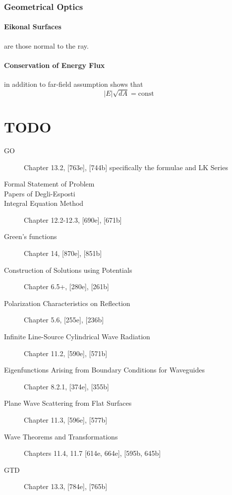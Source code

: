 \documentclass{article}
\numberwithin{equation}{section}
\begin{document}
    \subsubsection{Geometrical Optics}
        \paragraph{Eikonal Surfaces} are those normal to the ray. 
        \paragraph{Conservation of Energy Flux} in addition to far-field assumption shows
            that
            \begin{equation} \label{eq:conservationEnergyGO}
               \left| E \right|\sqrt{dA} = \text{const}
            \end{equation}
    \section*{TODO}
        \begin{description}
            \item[GO] Chapter 13.2, [763e], [744b] specifically the formulae and LK Series
            \item[Formal Statement of Problem]
            \item[Papers of Degli-Esposti]
            \item[Integral Equation Method] Chapter 12.2-12.3, [690e], [671b]
            \item[Green's functions] Chapter 14, [870e], [851b]
            \item[Construction of Solutions using Potentials] Chapter 6.5+, [280e], [261b] 
            \item[Polarization Characteristics on Reflection] Chapter 5.6, [255e], [236b] 
            \item[Infinite Line-Source Cylindrical Wave Radiation] Chapter 11.2, [590e],
                [571b] 
            \item[Eigenfunctions Arising from Boundary Conditions for Waveguides]
                Chapter 8.2.1, [374e], [355b] 
            \item[Plane Wave Scattering from Flat Surfaces] Chapter 11.3, [596e], [577b] 
            \item[Wave Theorems and Transformations] Chapters 11.4, 11.7 [614e, 664e],
                [595b, 645b] 
            \item[GTD] Chapter 13.3, [784e], [765b]
        \end{description}
\end{document}
